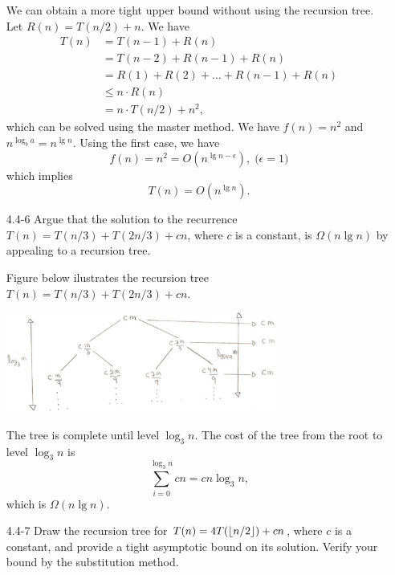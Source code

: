 \begin{enumerate}
\begin{framed}
We can obtain a more tight upper bound without using the recursion tree.
Let $R(n) = T(n/2) + n$. We have
\begin{equation*}
\begin{aligned}
  T(n) &= T(n - 1) + R(n)\\
       &= T(n - 2) + R(n - 1) + R(n)\\
       &= R(1) + R(2) + \dots + R(n - 1) + R(n)\\
       &\le n \cdot R(n)\\
       &= n \cdot T(n/2) + n^2,
\end{aligned}
\end{equation*}
which can be solved using the master method. We have $f(n) = n^2$ and
$n^{\log_b a} = n^{\lg n}$. Using the first case, we have
\[
f(n) = n^2 = O(n^{\lg n - \epsilon}), \; \text{($\epsilon = 1$)}
\]
which implies
\[
T(n) = O(n^{\lg n}).
\]
\end{framed}

\newpage

\item[4.4{-}6]{Argue that the solution to the recurrence
$T(n) = T(n/3) + T(2n/3) + cn$, where $c$ is a constant, is $\Omega(n \lg n)$ by
appealing to a recursion tree.}

\begin{framed}
Figure below ilustrates the recursion tree $T(n) = T(n/3) + T(2n/3) + cn$.

\begin{center}
\includegraphics[width=0.7\textwidth]{images/4_4_6_1.pdf}
\end{center}

The tree is complete until level $\log_3 n$. The cost of the tree from the root
to level $\log_3 n$ is
\[
  \sum_{i = 0}^{\log_3 n} cn = cn \log_3 n,
\]
which is $\Omega(n \lg n)$.
\end{framed}

\newpage

\item[4.4{-}7]{Draw the recursion tree for $T(n) = 4T(\lfloor n/2\rfloor) + cn$, where
$c$ is a constant, and provide a tight asymptotic bound on its solution. Verify
your bound by the substitution method.}


\end{enumerate}
